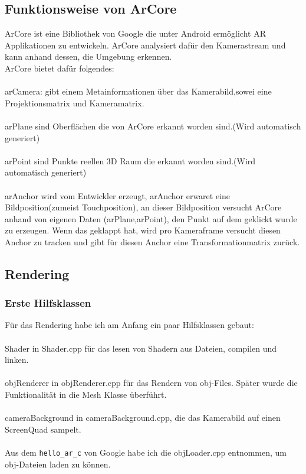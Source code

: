 \subsection{Funktionsweise von ArCore}
ArCore ist eine Bibliothek von Google die unter Android ermöglicht AR Applikationen zu entwickeln.
ArCore analysiert dafür den Kamerastream und kann anhand dessen, die Umgebung erkennen.\\
ArCore bietet dafür folgendes:
\\ \\
arCamera: gibt einem Metainformationen über das Kamerabild,sowei eine Projektionsmatrix und Kameramatrix.
\\ \\
arPlane sind Oberflächen die von ArCore erkannt worden sind.(Wird automatisch generiert)
\\ \\
arPoint sind Punkte reellen 3D Raum die erkannt worden sind.(Wird automatisch generiert)
\\ \\
arAnchor wird vom Entwickler erzeugt, arAnchor erwaret eine Bildposition(zumeist Touchposition), an dieser Bildposition versucht ArCore anhand von eigenen Daten (arPlane,arPoint), den Punkt auf dem geklickt wurde zu erzeugen. Wenn das geklappt hat, wird pro Kameraframe versucht diesen Anchor zu tracken und gibt für diesen Anchor eine Transformationmatrix zurück.


\subsection{Rendering}
\subsubsection{Erste Hilfsklassen}
Für das Rendering habe ich am Anfang ein paar Hilfsklassen gebaut:\\ \\
Shader in Shader.cpp für das lesen von Shadern aus Dateien, compilen und linken.\\ \\
objRenderer in objRenderer.cpp für das Rendern von obj-Files. Später wurde die
Funktionalität in die Mesh Klasse überführt.\\ \\
cameraBackground in cameraBackground.cpp, die das Kamerabild auf einen ScreenQuad sampelt.\\ \\
Aus dem \verb|hello_ar_c| von Google habe ich die objLoader.cpp entnommen, um obj-Dateien
laden zu können.
